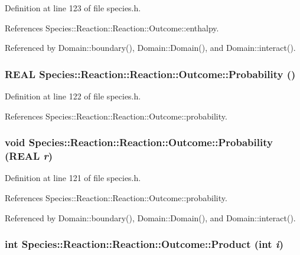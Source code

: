 Definition at line 123 of file species.h.

References Species::Reaction::Reaction::Outcome::enthalpy.

Referenced by Domain::boundary(), Domain::Domain(), and Domain::interact().\hypertarget{structSpecies_1_1Reaction_1_1Outcome_765753f408399d91d8cc94566042db1b}{
\subsubsection[{Probability}]{\setlength{\rightskip}{0pt plus 5cm}REAL Species::Reaction::Reaction::Outcome::Probability ()}}
\label{structSpecies_1_1Reaction_1_1Outcome_765753f408399d91d8cc94566042db1b}




Definition at line 122 of file species.h.

References Species::Reaction::Reaction::Outcome::probability.\hypertarget{structSpecies_1_1Reaction_1_1Outcome_c1287cbdc6b08733b48cbb57d5d3fc72}{
\subsubsection[{Probability}]{\setlength{\rightskip}{0pt plus 5cm}void Species::Reaction::Reaction::Outcome::Probability (REAL {\em r})}}
\label{structSpecies_1_1Reaction_1_1Outcome_c1287cbdc6b08733b48cbb57d5d3fc72}




Definition at line 121 of file species.h.

References Species::Reaction::Reaction::Outcome::probability.

Referenced by Domain::boundary(), Domain::Domain(), and Domain::interact().\hypertarget{structSpecies_1_1Reaction_1_1Outcome_27ca27f30fd0a0f36c0ca2b41be69eb1}{
\subsubsection[{Product}]{\setlength{\rightskip}{0pt plus 5cm}int Species::Reaction::Reaction::Outcome::Product (int {\em i})}}
\label{structSpecies_1_1Reaction_1_1Outcome_27ca27f30fd0a0f36c0ca2b41be69eb1}




